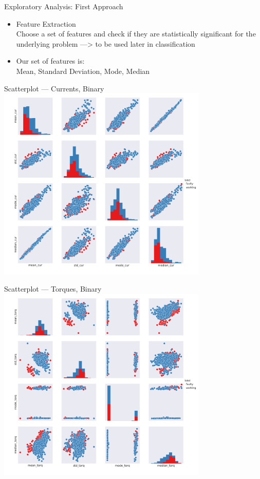 \documentclass[9pt]{beamer}
\begin{document}
\begin{frame}{Exploratory Analysis: First Approach}
\begin{itemize} %
\item {\large Feature Extraction}\\
Choose a set of features and check if they are statistically significant for the underlying problem ---> to be used later in classification
\item {\large Our set of features is:}\\
Mean, Standard Deviation, Mode, Median
\end{itemize}
\end{frame}

\begin{frame}{Scatterplot --- Currents, Binary}
\centering
\includegraphics[width=0.75\textwidth]{scattermatrix_currents_bin.pdf}
\end{frame}

\begin{frame}{Scatterplot --- Torques, Binary}
\centering
\includegraphics[width=0.75\textwidth]{scattermatrix_torques_bin.pdf}
\end{frame}
\end{document}
